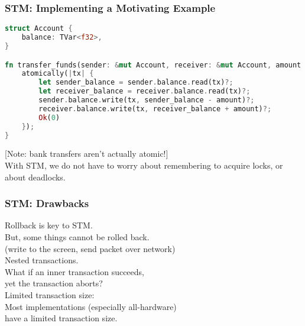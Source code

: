 \begin{frame}[fragile]
  \frametitle{STM: Implementing a Motivating Example}


\begin{lstlisting}[language=Rust]
struct Account {
    balance: TVar<f32>,
}

fn transfer_funds(sender: &mut Account, receiver: &mut Account, amount: f32) {
    atomically(|tx| {
        let sender_balance = sender.balance.read(tx)?;
        let receiver_balance = receiver.balance.read(tx)?;
        sender.balance.write(tx, sender_balance - amount)?;
        receiver.balance.write(tx, receiver_balance + amount)?;
        Ok(0)
    });
}
\end{lstlisting}

[Note: bank transfers aren't actually atomic!]\\[1em]

With STM, we do not have to worry about remembering to acquire locks,
      or about deadlocks.

\end{frame}

\begin{frame}
  \frametitle{STM: Drawbacks}


    Rollback is key to STM. \\
     \qquad But, some things cannot be rolled back. \\
     \qquad (write to the screen, send packet over network)\\[1em]

    Nested transactions. \\
     \qquad What if an inner transaction succeeds, \\ yet the
      transaction aborts? \\[1em]

    Limited transaction size: \\
 \qquad Most implementations (especially
    all-hardware) \\ have a limited transaction size.

\end{frame}

